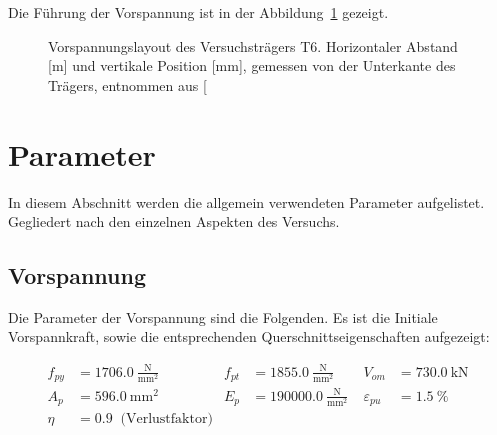 \documentclass[
  11pt,
  letterpaper,
]{scrreprt}
\begin{document}
Die Führung der Vorspannung ist in der
Abbildung~\ref{fig-vorspannung_t6} gezeigt.

\begin{figure}[H]


\caption{\label{fig-vorspannung_t6}Vorspannungslayout des
Versuchsträgers T6. Horizontaler Abstand {[}m{]} und vertikale Position
{[}mm{]}, gemessen von der Unterkante des Trägers, entnommen aus
{[}\citeproc{ref-sigrist_versuche_1993}{5}{]}}

\end{figure}%

\section{Parameter}\label{parameter}

In diesem Abschnitt werden die allgemein verwendeten Parameter
aufgelistet. Gegliedert nach den einzelnen Aspekten des Versuchs.

\subsection{Vorspannung}\label{vorspannung}

Die Parameter der Vorspannung sind die Folgenden. Es ist die Initiale
Vorspannkraft, sowie die entsprechenden Querschnittseigenschaften
aufgezeigt:

$$
\begin{aligned}
f_{py} &= 1706.0\ \frac{\mathrm{N}}{\mathrm{mm}^{2}} \; 
 &f_{pt} &= 1855.0\ \frac{\mathrm{N}}{\mathrm{mm}^{2}} \; 
 &V_{om} &= 730.0\ \mathrm{kN} \; 
\\[10pt]
 A_{p} &= 596.0\ \mathrm{mm}^{2} \; 
 &E_{p} &= 190000.0\ \frac{\mathrm{N}}{\mathrm{mm}^{2}} \; 
 &\varepsilon_{pu} &= 1.5\ \mathrm{\%} \; 
\\[10pt]
 \eta &= 0.9 \; \;\textrm{(Verlustfaktor)}
\end{aligned}
$$
\end{document}
